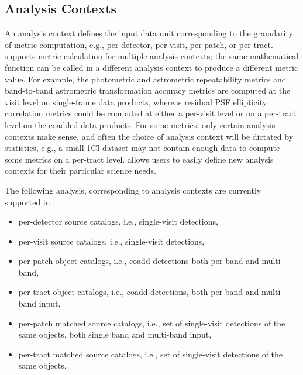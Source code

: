 \subsection{Analysis Contexts} \label{ssec:analysis_context}

An analysis context defines the input data unit corresponding to the granularity of metric computation, e.g., per-detector, per-visit, per-patch, or per-tract.
\faro supports metric calculation for multiple analysis contexts; the same mathematical function can be called in a different analysis context to produce a different metric value.
For example, the photometric and astrometric repeatability metrics and band-to-band astrometric transformation accuracy metrics are computed at the visit level on single-frame data products, whereas residual PSF ellipticity correlation metrics could be computed at either a per-visit level or on a per-tract level on the coadded data products.
For some metrics, only certain analysis contexts make sense, and often the choice of analysis context will be dictated by statistics, e.g., a small 1\degsq CI dataset may not contain enough data to compute some metrics on a per-tract level.
\faro allows users to easily define new analysis contexts for their particular science needs.


The following analysis, corresponding to analysis contexts are currently supported in \faro:
\begin{itemize}
\item per-detector source catalogs, i.e., single-visit detections,
\item per-visit source catalogs, i.e., single-visit detections,
\item per-patch object catalogs, i.e., coadd detections both per-band and multi-band,
\item per-tract object catalogs, i.e., coadd detections, both per-band and multi-band input,
\item per-patch matched source catalogs, i.e., set of single-visit detections of the same objects, both single band and multi-band input,
\item per-tract matched source catalogs, i.e., set of single-visit detections of the same objects.
\end{itemize}

